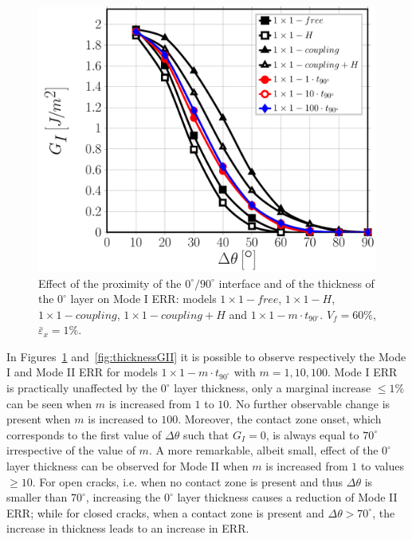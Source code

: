 \documentclass[Review,sagev,times]{sagej}
\begin{document}
\begin{figure}[!htb]
\centering
\includegraphics[height=0.375\textheight]{1x1-i-vf60-GI.pdf}
\caption{Effect of the proximity of the $0^{\circ}/90^{\circ}$ interface and of the thickness of the $0^{\circ}$ layer on Mode I ERR: models $1\times 1-free$, $1\times 1-H$, $1\times 1-coupling$, $1\times 1-coupling+H$ and $1\times 1-m\cdot t_{90^{\circ}}$. $V_{f}=60\%$, $\bar{\varepsilon}_{x}=1\%$.}\label{fig:thicknessGI}
\end{figure}

In Figures~\ref{fig:thicknessGI} and~\ref{fig:thicknessGII} it is possible to observe respectively the Mode I and Mode II ERR for models $1\times 1-m\cdot t_{90^{\circ}}$ with $m=1,10,100$. Mode I ERR is practically unaffected by the $0^{\circ}$ layer thickness, only a marginal increase $\leq1\%$ can be seen when $m$ is increased from $1$ to $10$. No further observable change is present when $m$ is increased to $100$. Moreover, the contact zone onset, which corresponds to the first value of $\Delta\theta$ such that $G_{I}=0$, is always equal to $70^{\circ}$ irrespective of the value of $m$. A more remarkable, albeit small, effect of the $0^{\circ}$ layer thickness can be observed for Mode II when $m$ is increased from $1$ to values $\geq10$. For open cracks, i.e. when no contact zone is present and thus $\Delta\theta$ is smaller than $70^{\circ}$, increasing the $0^{\circ}$ layer thickness causes a reduction of Mode II ERR; while for closed cracks, when a contact zone is present and $\Delta\theta>70^{\circ}$, the increase in thickness leads to an increase in ERR.\\
\end{document}
